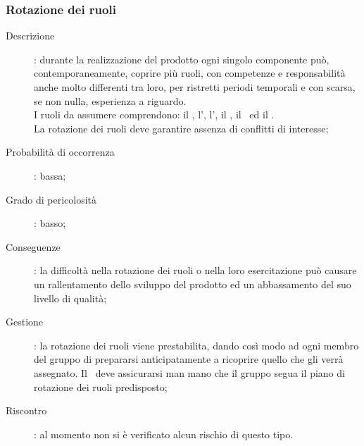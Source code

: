 \documentclass[../PianoDiProgetto.tex]{subfiles}
\begin{document}
		\subsubsection{Rotazione dei ruoli}
		\begin{description} 
			\item [Descrizione]: durante la realizzazione del prodotto ogni singolo componente può, contemporaneamente, coprire più ruoli, con competenze e responsabilità anche molto differenti tra loro, per ristretti periodi temporali e con scarsa, se non nulla, esperienza a riguardo.\\
			I ruoli da assumere comprendono: il \responsabilediprogetto, l'\amministratore, l'\analista, il \progettista, il \programmatore\ ed il \verificatore.\\
			La rotazione dei ruoli deve garantire assenza di conflitti di interesse;
			\item [Probabilità di occorrenza]: bassa;
			\item [Grado di pericolosità]: basso;
			\item [Conseguenze]: la difficoltà nella rotazione dei ruoli o nella loro esercitazione può causare un rallentamento dello sviluppo del prodotto ed un abbassamento del suo livello di qualità;
			\item [Gestione]: la rotazione dei ruoli viene prestabilita, dando così modo ad ogni membro del gruppo di prepararsi anticipatamente a ricoprire quello che gli verrà assegnato. Il \responsabilediprogetto\ deve assicurarsi man mano che il gruppo segua il piano di rotazione dei ruoli predisposto;
			\item [Riscontro]: al momento non si è verificato alcun rischio di questo tipo.
		\end{description}
\end{document}
